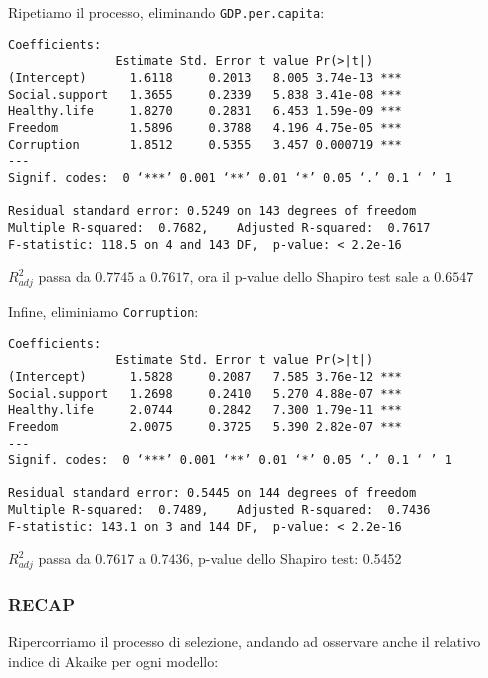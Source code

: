 \documentclass{beamer}
\begin{document}
\begin{frame}[fragile]
    Ripetiamo il processo, eliminando \texttt{GDP.per.capita}:

    \tiny
    \begin{verbatim}
Coefficients:
               Estimate Std. Error t value Pr(>|t|)    
(Intercept)      1.6118     0.2013   8.005 3.74e-13 ***
Social.support   1.3655     0.2339   5.838 3.41e-08 ***
Healthy.life     1.8270     0.2831   6.453 1.59e-09 ***
Freedom          1.5896     0.3788   4.196 4.75e-05 ***
Corruption       1.8512     0.5355   3.457 0.000719 ***
---
Signif. codes:  0 ‘***’ 0.001 ‘**’ 0.01 ‘*’ 0.05 ‘.’ 0.1 ‘ ’ 1

Residual standard error: 0.5249 on 143 degrees of freedom
Multiple R-squared:  0.7682,    Adjusted R-squared:  0.7617 
F-statistic: 118.5 on 4 and 143 DF,  p-value: < 2.2e-16
    \end{verbatim}

    \normalsize 
    $R^2_{adj}$ passa da $0.7745$ a $0.7617$, ora il p-value dello Shapiro test sale a $0.6547$
\end{frame}

\begin{frame}[fragile]
    Infine, eliminiamo \texttt{Corruption}:

    \tiny
    \begin{verbatim}
Coefficients:
               Estimate Std. Error t value Pr(>|t|)    
(Intercept)      1.5828     0.2087   7.585 3.76e-12 ***
Social.support   1.2698     0.2410   5.270 4.88e-07 ***
Healthy.life     2.0744     0.2842   7.300 1.79e-11 ***
Freedom          2.0075     0.3725   5.390 2.82e-07 ***
---
Signif. codes:  0 ‘***’ 0.001 ‘**’ 0.01 ‘*’ 0.05 ‘.’ 0.1 ‘ ’ 1

Residual standard error: 0.5445 on 144 degrees of freedom
Multiple R-squared:  0.7489,    Adjusted R-squared:  0.7436 
F-statistic: 143.1 on 3 and 144 DF,  p-value: < 2.2e-16
    \end{verbatim}

    \normalsize 
    $R^2_{adj}$ passa da $0.7617$ a $0.7436$, p-value dello Shapiro test: 0.5452
\end{frame}

\begin{frame}
    \frametitle{RECAP}
    Ripercorriamo il processo di selezione, andando ad osservare anche il relativo indice di Akaike per ogni modello:
\end{frame}
\end{document}
